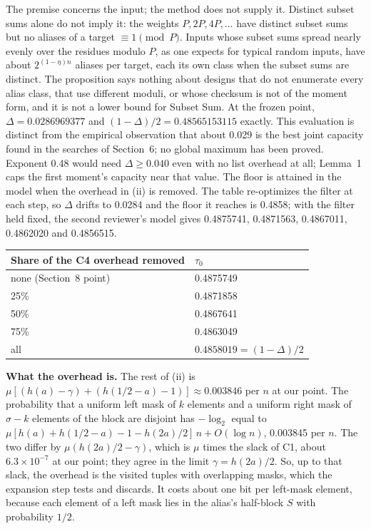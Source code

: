 \documentclass[11pt]{article}
\theoremstyle{plain}
\begin{document}
The premise concerns the input; the method does not supply it. Distinct subset sums alone do not imply it: the weights $P, 2P, 4P, \dots$ have distinct subset sums but no aliases of a target $\equiv 1 \pmod P$. Inputs whose subset sums spread nearly evenly over the residues modulo $P$, as one expects for typical random inputs, have about $2^{(1-\eta)n}$ aliases per target, each its own class when the subset sums are distinct. The proposition says nothing about designs that do not enumerate every alias class, that use different moduli, or whose checksum is not of the moment form, and it is not a lower bound for Subset Sum. At the frozen point, $\Delta=0.0286969377$ and $(1-\Delta)/2=0.48565153115$ exactly. This evaluation is distinct from the empirical observation that about 0.029 is the best joint capacity found in the searches of Section~6; no global maximum has been proved. Exponent 0.48 would need $\Delta \ge 0.040$ even with no list overhead at all; Lemma~1 caps the first moment's capacity near that value. The floor is attained in the model when the overhead in (ii) is removed. The table re-optimizes the filter at each step, so $\Delta$ drifts to 0.0284 and the floor it reaches is 0.4858; with the filter held fixed, the second reviewer's model gives 0.4875741, 0.4871563, 0.4867011, 0.4862020 and 0.4856515.

\begin{center}
\small
\begin{tabular}{ll}
\toprule
Share of the C4 overhead removed & $\tau_0$ \\
\midrule
none (Section~8 point) & 0.4875749 \\
25\% & 0.4871858 \\
50\% & 0.4867641 \\
75\% & 0.4863049 \\
all & $0.4858019 = (1 - \Delta)/2$ \\
\bottomrule
\end{tabular}
\end{center}

\textbf{What the overhead is.} The rest of (ii) is $\mu[(h(a) - \gamma) + (h(1/2 - a) - 1)]\approx0.003846$ per $n$ at our point. The probability that a uniform left mask of $k$ elements and a uniform right mask of $\sigma - k$ elements of the block are disjoint has $-\log_2$ equal to $\mu[h(a) + h(1/2 - a) - 1 - h(2a)/2]\,n + O(\log n)$, 0.003845 per $n$. The two differ by $\mu(h(2a)/2 - \gamma)$, which is $\mu$ times the slack of C1, about $6.3\times10^{-7}$ at our point; they agree in the limit $\gamma = h(2a)/2$. So, up to that slack, the overhead is the visited tuples with overlapping masks, which the expansion step tests and discards. It costs about one bit per left-mask element, because each element of a left mask lies in the alias's half-block $S$ with probability $1/2$.
\end{document}
